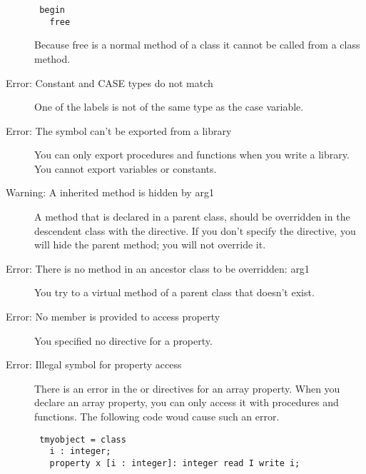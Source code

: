 \begin{description}
\begin{verbatim}
 begin
   free
 \end{verbatim}
 Because free is a normal method of a class it cannot be called from a class
 method.
\item [Error: Constant and CASE types do not match]
 One of the labels is not of the same type as the case variable.
\item [Error: The symbol can't be exported from a library]
 You can only export procedures and functions when you write a library. You
 cannot export variables or constants.
\item [Warning: A inherited method is hidden by arg1]
 A method that is declared  in a parent class, should be
 overridden in the descendent class with the  directive. If you
 don't specify the  directive, you will hide the parent method;
 you will not override it.
\item [Error: There is no method in an ancestor class to be overridden: arg1]
 You try to  a virtual method of a parent class that doesn't
 exist.
\item [Error: No member is provided to access property]
 You specified no  directive for a property. 
\item [Error: Illegal symbol for property access]
 There is an error in the  or  directives for an array 
 property. When you declare an array property, you can only access it with 
 procedures and functions. The following code woud cause such an error.
 \begin{verbatim}
 tmyobject = class
   i : integer;
   property x [i : integer]: integer read I write i;
 \end{verbatim}
  

\end{description}
